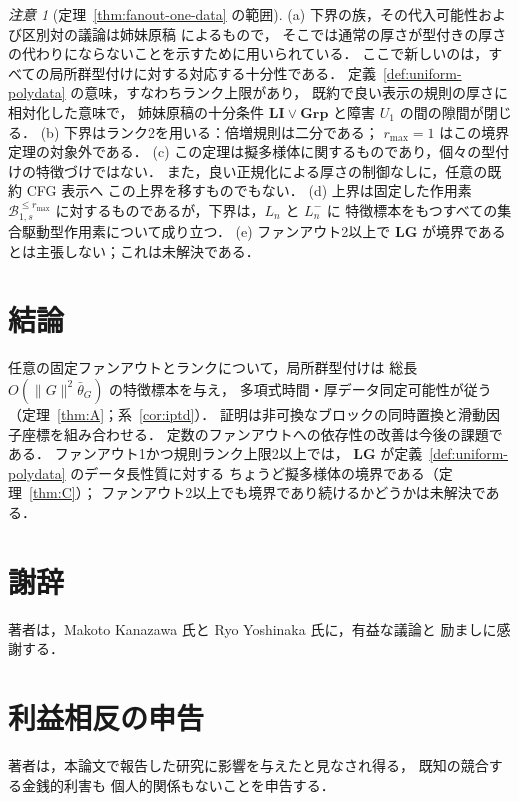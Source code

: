 \documentclass[11pt,a4paper]{ltjsarticle}
\numberwithin{equation}{section}
\theoremstyle{plain}
\theoremstyle{definition}
\theoremstyle{remark}
\newtheorem{remark}[theorem]{注意}
\theoremstyle{plain}
\begin{document}
\begin{remark}[定理~\ref{thm:fanout-one-data} の範囲]
\label{rem:fanout-one-data}
(a) 下界の族，その代入可能性および区別対の議論は姉妹原稿
\cite[Proposition~6.4 and Appendix~C]{kuriyamaCFG} によるもので，
そこでは通常の厚さが型付きの厚さの代わりにならないことを示すために用いられている．
ここで新しいのは，すべての局所群型付けに対する対応する十分性である．
定義~\ref{def:uniform-polydata} の意味，すなわちランク上限があり，
既約で良い表示の規則の厚さに相対化した意味で，
姉妹原稿の十分条件 $\mathbf{LI}\vee\mathbf{Grp}$ と障害 $U_1$ の間の隙間が閉じる．
(b) 下界はランク2を用いる：倍増規則は二分である；
$r_{\max}=1$ はこの境界定理の対象外である．
(c) この定理は擬多様体に関するものであり，個々の型付けの特徴づけではない．
また，良い正規化による厚さの制御なしに，任意の既約 CFG 表示へ
この上界を移すものでもない．
(d) 上界は固定した作用素
$\mathcal B^{\le r_{\max}}_{1,s}$ に対するものであるが，下界は，$L_n$ と $L_n^-$ に
特徴標本をもつすべての集合駆動型作用素について成り立つ．
(e) ファンアウト2以上で $\mathbf{LG}$ が境界であるとは主張しない；これは未解決である．
\end{remark}

\section{結論}
\label{sec:conclusion}
任意の固定ファンアウトとランクについて，局所群型付けは
総長 $O(\|G\|^2\bar\theta_G)$ の特徴標本を与え，
多項式時間・厚データ同定可能性が従う
（定理~\ref{thm:A}；系~\ref{cor:iptd}）．
証明は非可換なブロックの同時置換と滑動因子座標を組み合わせる．
定数のファンアウトへの依存性の改善は今後の課題である．
ファンアウト1かつ規則ランク上限2以上では，
$\mathbf{LG}$ が定義~\ref{def:uniform-polydata} のデータ長性質に対する
ちょうど擬多様体の境界である（定理~\ref{thm:C}）；
ファンアウト2以上でも境界であり続けるかどうかは未解決である．

\section*{謝辞}
著者は，Makoto Kanazawa 氏と Ryo Yoshinaka 氏に，有益な議論と
励ましに感謝する．

\section*{利益相反の申告}
著者は，本論文で報告した研究に影響を与えたと見なされ得る，
既知の競合する金銭的利害も
個人的関係もないことを申告する．
\end{document}
